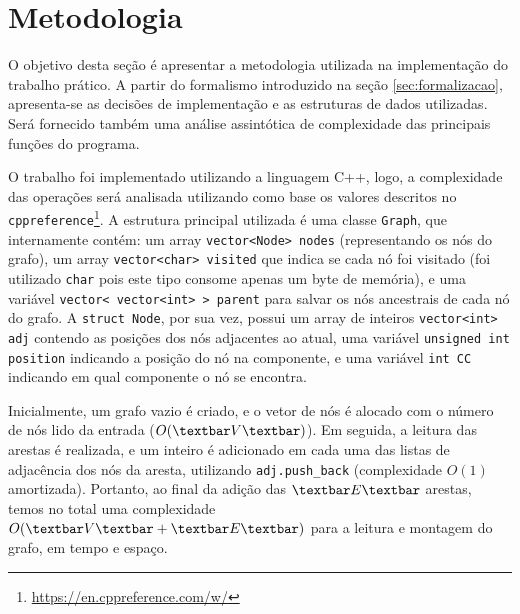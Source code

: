 \section{Metodologia} \label{sec:metodologia}

O objetivo desta seção é apresentar a metodologia utilizada na implementação do trabalho prático. A partir do formalismo introduzido na seção \ref{sec:formalizacao}, apresenta-se as decisões de implementação e as estruturas de dados utilizadas. Será fornecido também uma análise assintótica de complexidade das principais funções do programa.


O trabalho foi implementado utilizando a linguagem C++, logo, a complexidade das operações será analisada utilizando como base os valores descritos no \texttt{cppreference}\footnote{\url{https://en.cppreference.com/w/}}. A estrutura principal utilizada é uma classe \texttt{Graph}, que internamente contém: um array \texttt{vector<Node> nodes} (representando os nós do grafo), um array \texttt{vector<char> visited} que indica se cada nó foi visitado (foi utilizado \texttt{char} pois este tipo consome apenas um byte de memória), e uma variável \texttt{vector< vector<int> > parent} para salvar os nós ancestrais de cada nó do grafo. A \texttt{struct Node}, por sua vez, possui um array de inteiros \texttt{vector<int> adj} contendo as posições dos nós adjacentes ao atual, uma variável \texttt{unsigned int position} indicando a posição do nó na componente, e uma variável \texttt{int CC} indicando em qual componente o nó se encontra.

Inicialmente, um grafo vazio é criado, e o vetor de nós é alocado com o número de nós lido da entrada ($O(\textbar V \textbar )$). Em seguida, a leitura das arestas é realizada, e um inteiro é adicionado em cada uma das listas de adjacência dos nós da aresta, utilizando \texttt{adj.push\_back} (complexidade $O(1)$ amortizada). Portanto, ao final da adição das $\textbar E \textbar$ arestas, temos no total uma complexidade $O(\textbar V \textbar + \textbar E \textbar )$ para a leitura e montagem do grafo, em tempo e espaço.

